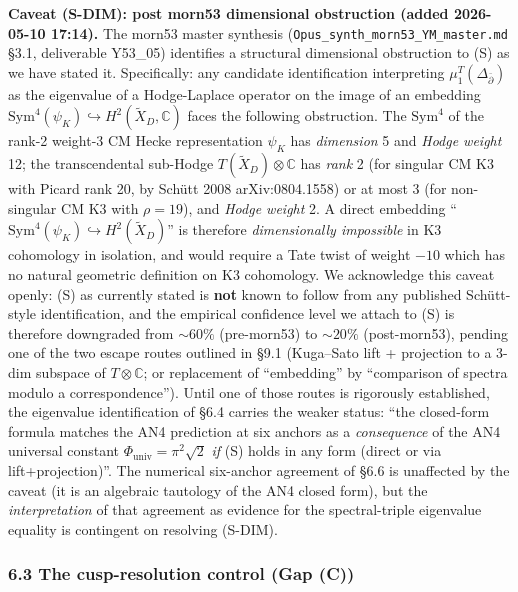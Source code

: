 \documentclass[
  11pt,
  a4paper,
]{amsart}
\begin{document}
\textbf{Caveat (S-DIM): post morn53 dimensional obstruction (added 2026-05-10 17:14).}
The morn53 master synthesis (\texttt{Opus\_synth\_morn53\_YM\_master.md} §3.1, deliverable
Y53\_05) identifies a structural dimensional obstruction to (S) as we have stated
it. Specifically: any candidate identification interpreting
\(\mu_1^T(\Delta_{\bar\partial})\) as the eigenvalue of a Hodge-Laplace operator on
the image of an embedding \(\mathrm{Sym}^4(\psi_K) \hookrightarrow H^2(\widetilde{X}_D, \mathbb{C})\)
faces the following obstruction. The \(\mathrm{Sym}^4\) of the rank-2 weight-3 CM
Hecke representation \(\psi_K\) has \emph{dimension} 5 and \emph{Hodge weight} 12; the
transcendental sub-Hodge \(T(\widetilde{X}_D) \otimes \mathbb{C}\) has \emph{rank} 2 (for
singular CM K3 with Picard rank 20, by Schütt 2008 arXiv:0804.1558) or at most
3 (for non-singular CM K3 with \(\rho = 19\)), and \emph{Hodge weight} 2. A
direct embedding ``\(\mathrm{Sym}^4(\psi_K) \hookrightarrow H^2(\widetilde{X}_D)\)''
is therefore \emph{dimensionally impossible} in K3 cohomology in isolation, and would
require a Tate twist of weight \(-10\) which has no natural geometric definition
on K3 cohomology. We acknowledge this caveat openly: (S) as currently stated is
\textbf{not} known to follow from any published Schütt-style identification, and the
empirical confidence level we attach to (S) is therefore downgraded from
\(\sim 60\%\) (pre-morn53) to \(\sim 20\%\) (post-morn53), pending one of the two
escape routes outlined in §9.1 (Kuga--Sato lift + projection to a 3-dim subspace
of \(T \otimes \mathbb{C}\); or replacement of ``embedding'' by ``comparison of
spectra modulo a correspondence''). Until one of those routes is rigorously
established, the eigenvalue identification of §6.4 carries the weaker status:
``the closed-form formula matches the AN4 prediction at six anchors as a
\emph{consequence} of the AN4 universal constant \(\Phi_{\mathrm{univ}} = \pi^2 \sqrt{2}\)
\emph{if} (S) holds in any form (direct or via lift+projection)''. The numerical
six-anchor agreement of §6.6 is unaffected by the caveat (it is an algebraic
tautology of the AN4 closed form), but the \emph{interpretation} of that agreement
as evidence for the spectral-triple eigenvalue equality is contingent on
resolving (S-DIM).

\hypertarget{the-cusp-resolution-control-gap-c}{%
\subsubsection{6.3 The cusp-resolution control (Gap (C))}\label{the-cusp-resolution-control-gap-c}}
\end{document}
